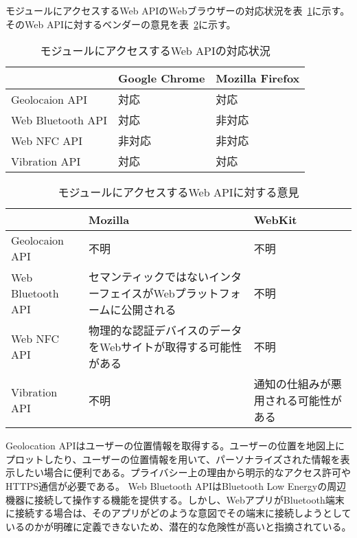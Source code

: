 モジュールにアクセスするWeb APIのWebブラウザーの対応状況を表~\ref{table:モジュールにアクセスするWeb APIの対応状況}に示す。そのWeb APIに対するベンダーの意見を表~\ref{table:モジュールにアクセスするWeb APIに対する意見}に示す。
\begin{table}
  \caption{モジュールにアクセスするWeb APIの対応状況}
  \label{table:モジュールにアクセスするWeb APIの対応状況}
  \centering
  \begin{tabular}{|p{13em}|p{8em}|p{8em}|}
    \hline
    & Google Chrome & Mozilla Firefox \\ \hline
    Geolocaion API & \cellcolor{green!25}対応 & \cellcolor{green!25}対応 \\ \hline
    Web Bluetooth API & \cellcolor{green!25}対応 & \cellcolor{red!25}非対応 \\ \hline
    Web NFC API & \cellcolor{red!25}非対応 & \cellcolor{red!25}非対応 \\ \hline
    Vibration API & \cellcolor{green!25}対応 & \cellcolor{green!25}対応 \\ \hline
  \end{tabular}
\end{table}
\begin{table}
    \centering
    \caption{モジュールにアクセスするWeb APIに対する意見}
    \label{table:モジュールにアクセスするWeb APIに対する意見}
    \begin{tabular}{|p{13em}|p{13em}|p{13em}|}
         \hline
         & Mozilla & WebKit \\ \hline
         Geolocaion API & 不明 & 不明 \\ \hline
         Web Bluetooth API & \cellcolor{red!25}セマンティックではないインターフェイスがWebプラットフォームに公開される~\cite{MozillaWebBluetoothAPI} & 不明 \\ \hline
         Web NFC API & \cellcolor{red!25}物理的な認証デバイスのデータをWebサイトが取得する可能性がある~\cite{MozillaWebNFCAPI} & 不明 \\ \hline
         Vibration API & 不明 & \cellcolor{red!25}通知の仕組みが悪用される可能性がある \\ \hline
    \end{tabular}
\end{table}
Geolocation APIはユーザーの位置情報を取得する。ユーザーの位置を地図上にプロットしたり、ユーザーの位置情報を用いて、パーソナライズされた情報を表示したい場合に便利である。プライバシー上の理由から明示的なアクセス許可やHTTPS通信が必要である。
Web Bluetooth APIはBluetooth Low Energyの周辺機器に接続して操作する機能を提供する。しかし、WebアプリがBluetooth端末に接続する場合は、そのアプリがどのような意図でその端末に接続しようとしているのかが明確に定義できないため、潜在的な危険性が高いと指摘されている。

